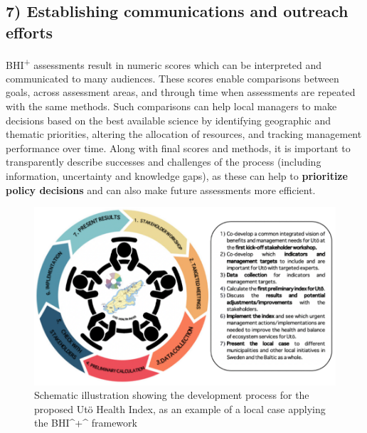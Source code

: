 \documentclass[
]{book}
\begin{document}
\hypertarget{establishing-communications-and-outreach-efforts}{%
\subsection*{7) Establishing communications and outreach efforts}\label{establishing-communications-and-outreach-efforts}}

BHI\textsuperscript{+} assessments result in numeric scores which can be interpreted and communicated to many audiences. These scores enable comparisons between goals, across
assessment areas, and through time when assessments are repeated with the same methods. Such comparisons can help local managers to make decisions based on the best available science by identifying geographic and thematic priorities, altering the allocation of resources, and tracking management performance over time. Along with final scores and methods, it is important to transparently describe successes and challenges of the process (including information, uncertainty and knowledge gaps), as these can help to \textbf{prioritize policy decisions} and can also make future assessments more efficient.

\begin{figure}

{\centering \includegraphics[width=800px]{_book/_main_files/figure-html/development-process} 

}

\caption{Schematic illustration showing the development process for the proposed Utö Health Index, as an example of a local case applying the BHI^+^ framework}\label{fig:unnamed-chunk-8}
\end{figure}
\end{document}
